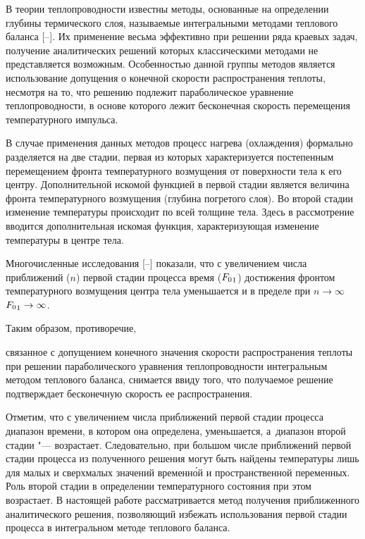  В теории теплопроводности известны методы, основанные на определении глубины термического слоя, называемые интегральными методами теплового баланса [--]. Их применение весьма эффективно при решении ряда краевых задач, получение аналитических решений которых классическими методами не представляется возможным. Особенностью данной группы методов является использование допущения о конечной скорости распространения теплоты, несмотря на то, что решению подлежит параболическое уравнение теплопроводности, в основе которого лежит бесконечная скорость перемещения температурного импульса. 

В случае применения данных методов процесс нагрева (охлаждения) формально разделяется на две стадии, первая из которых характеризуется постепенным перемещением фронта температурного возмущения от поверхности тела к его центру. Дополнительной искомой функцией в первой стадии является величина фронта температурного возмущения (глубина погретого слоя). Во второй стадии изменение температуры происходит по всей толщине тела. Здесь в рассмотрение вводится дополнительная искомая функция, характеризующая изменение температуры в центре тела.



Многочисленные исследования [--] показали, что с увеличением числа приближений ($n$) первой стадии процесса время (${\sl F_0}_1$) достижения фронтом температурного возмущения центра тела уменьшается и в пределе при $n\rightarrow \infty$ ${\sl F_0}_1\rightarrow \infty$. 

Таким образом, противоречие, 

связанное с допущением  конечного значения скорости распространения теплоты при решении параболического уравнения теплопроводности интегральным методом теплового баланса, снимается ввиду того, что получаемое решение подтверждает бесконечную скорость ее распространения.



Отметим, что с увеличением числа приближений первой стадии процесса диапазон времени, в котором она определена, уменьшается, а~диапазон второй стадии "--- возрастает. Следовательно, при большом числе приближений первой стадии процесса из полученного решения могут быть найдены температуры лишь для малых и сверхмалых значений временн\'ой и пространственной переменных. Роль второй стадии в определении температурного состояния при этом возрастает. В настоящей работе рассматривается метод получения приближенного аналитического решения, позволяющий избежать использования первой стадии процесса в интегральном методе теплового баланса.





